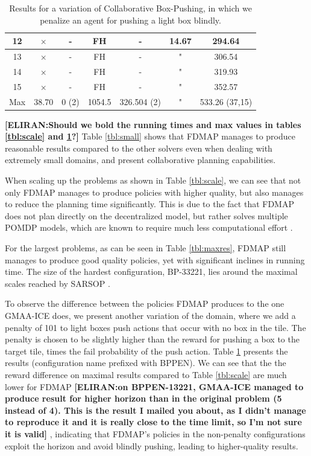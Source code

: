 \documentclass[letterpaper]{article} %
\theoremstyle{definition}
\newcommand{\eliran}[1]{\textbf{[\color{red}ELIRAN:#1]}}
\newcommand{\cbp}[0]{Collaborative Box-Pushing}
\begin{document}
\begin{table}
{\begin{tabular}{||c|c|c|c|c|c|c||}
         \hline
         12 & $\times$ & - & FH & - & 14.67 & 294.64\\
        \hline
         13 & $\times$ & - & FH & - & " & 306.54 \\
        \hline
         14 & $\times$ & - & FH & - & " & 319.93 \\
        \hline
         15 & $\times$ & - & FH & - & " & 352.57 \\
        \hline
         Max& 38.70 & 0 (2) & 1054.5 & 326.504 (2) & " & 533.26 (37,15) \\
         \hline
    \end{tabular}
    }
    \caption{\label{tbl:bppen}Results for a variation of \cbp, in which we penalize an agent for pushing a light box blindly.}
\end{table}


\eliran{Should we bold the running times and max values in tables \ref{tbl:scale} and \ref{tbl:bppen}?}
Table \ref{tbl:small} shows that FDMAP manages to produce reasonable results compared to the other solvers even when dealing with extremely small domains, and present collaborative planning capabilities.

When scaling up the problems as shown in Table \ref{tbl:scale}, we can see that not only FDMAP manages to produce policies with higher quality, but also manages to reduce the planning time significantly. This is due to the fact that FDMAP does not plan directly on the decentralized model, but rather solves multiple POMDP models, which are known to require much less computational effort \cite{DECPOMDPCOMP}.

For the largest problems, as can be seen in Table \ref{tbl:maxres}, FDMAP still manages to produce good quality policies, yet with significant inclines in running time. The size of the hardest configuration, BP-33221, lies around the maximal scales reached by SARSOP \cite{SARSOP}.

To observe the difference between the policies FDMAP produces to the one GMAA-ICE does, we present another variation of the domain, where we add a penalty of 101 to light boxes push actions that occur with no box in the tile. The penalty is chosen to be slightly higher than the reward for pushing a box to the target tile, times the fail probability of the push action. Table \ref{tbl:bppen} presents the results (configuration name prefixed with BPPEN). We can see that the the reward difference on maximal results compared to Table \ref{tbl:scale} are much lower for FDMAP
\eliran{on BPPEN-13221, GMAA-ICE managed to produce result for higher horizon than in the original problem (5 instead of 4). This is the result I mailed you about, as I didn't manage to reproduce it and it is really close to the time limit, so I'm not sure it is valid} , indicating that FDMAP's policies in the non-penalty configurations exploit the horizon and avoid blindly pushing, leading to higher-quality results.
\end{document}
